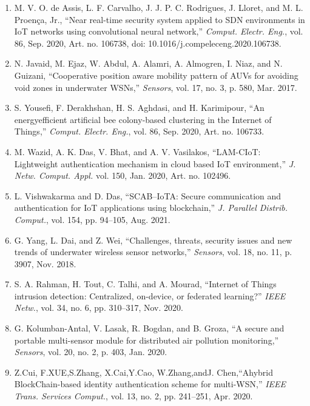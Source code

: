 \documentclass{article} %
\begin{document}
\begin{enumerate}
\item  M. V. O. de Assis, L. F. Carvalho, J. J. P. C. Rodrigues, J. Lloret, and M. L. Proen\c{c}a, Jr., ``Near real-time security system applied to SDN environments in IoT networks using convolutional neural network,'' \textit{Comput. Electr. Eng.}, vol. 86, Sep. 2020, Art. no. 106738, doi: 10.1016/j.compeleceng.2020.106738.

\item  N. Javaid, M. Ejaz, W. Abdul, A. Alamri, A. Almogren, I. Niaz, and N. Guizani, ``Cooperative position aware mobility pattern of AUVs for avoiding void zones in underwater WSNs,'' \textit{Sensors}, vol. 17, no. 3, p. 580, Mar. 2017.

\item  S. Yousefi, F. Derakhshan, H. S. Aghdasi, and H. Karimipour, ``An energyefficient artificial bee colony-based clustering in the Internet of Things,'' \textit{Comput. Electr. Eng.}, vol. 86, Sep. 2020, Art. no. 106733.

\item  M. Wazid, A. K. Das, V. Bhat, and A. V. Vasilakos, ``LAM-CIoT: Lightweight authentication mechanism in cloud based IoT environment,'' \textit{J. Netw. Comput. Appl. }vol. 150, Jan. 2020, Art. no. 102496.

\item  L. Vishwakarma and D. Das, ``SCAB--IoTA: Secure communication and authentication for IoT applications using blockchain,'' \textit{J. Parallel Distrib. Comput.}, vol. 154, pp. 94--105, Aug. 2021.

\item  G. Yang, L. Dai, and Z. Wei, ``Challenges, threats, security issues and new trends of underwater wireless sensor networks,'' \textit{Sensors}, vol. 18, no. 11, p. 3907, Nov. 2018.

\item  S. A. Rahman, H. Tout, C. Talhi, and A. Mourad, ``Internet of Things intrusion detection: Centralized, on-device, or federated learning?'' \textit{IEEE Netw.}, vol. 34, no. 6, pp. 310--317, Nov. 2020.

\item  G. Kolumban-Antal, V. Lasak, R. Bogdan, and B. Groza, ``A secure and portable multi-sensor module for distributed air pollution monitoring,'' \textit{Sensors}, vol. 20, no. 2, p. 403, Jan. 2020.

\item  Z.Cui, F.XUE,S.Zhang, X.Cai,Y.Cao, W.Zhang,andJ. Chen,``Ahybrid BlockChain-based identity authentication scheme for multi-WSN,'' \textit{IEEE Trans. Services Comput.}, vol. 13, no. 2, pp. 241--251, Apr. 2020.


\end{enumerate}
\end{document}
